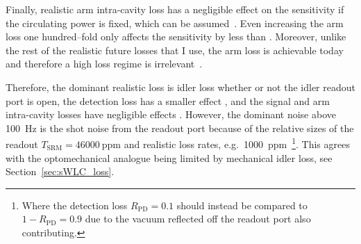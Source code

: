 Finally, realistic arm intra-cavity loss has a negligible effect on the sensitivity if the circulating power is fixed, which can be assumed~\cite{}. Even increasing the arm loss one hundred--fold only affects the sensitivity by less than . Moreover, unlike the rest of the realistic future losses that I use, the arm loss is achievable today  and therefore a high loss regime is irrelevant~\cite{}. %

Therefore, the dominant realistic loss is idler loss whether or not the idler readout port is open, the detection loss has a smaller effect , and the signal and arm intra-cavity losses have negligible effects . However, the dominant noise above 100~Hz is the shot noise from the readout port because of the relative sizes of the readout $T_\text{SRM}=46000~\text{ppm}$ and realistic loss rates, e.g.\ 1000~ppm~\footnote{Where the detection loss $R_\text{PD}=0.1$ should instead be compared to $1-R_\text{PD}=0.9$ due to the vacuum reflected off the readout port also contributing.}. This agrees with the optomechanical analogue being limited by mechanical idler loss, see Section~\ref{sec:sWLC_loss}. 

